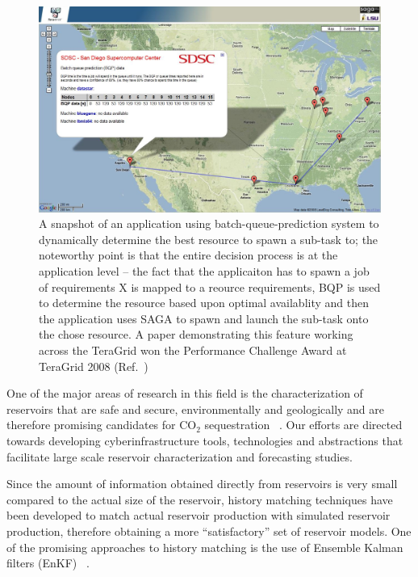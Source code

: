 \documentclass[a4paper,10pt]{article}
\begin{document}
\begin{figure}
\begin{center}
\includegraphics[scale=0.33]{gmaps_bqp.jpg}
\end{center}
\caption{A snapshot of an application using batch-queue-prediction system to dynamically determine the best resource to spawn a sub-task to; the noteworthy point is that the entire decision process is at the application level -- the fact that the applicaiton has to spawn a job of requirements X is mapped to a reource requirements, BQP is used to determine the resource based upon optimal availablity and then the application uses SAGA to spawn and launch the sub-task onto the chose resource. A paper demonstrating this feature working across the TeraGrid won the Performance Challenge Award at TeraGrid 2008 (Ref.~\cite{teragrid08})}
\label{}
\end{figure}

One of the major areas of research in this field is the characterization of reservoirs that are safe and secure, environmentally and geologically and are therefore promising candidates for CO$_2$ sequestration ~\cite{GeoRPT,Luigi}. Our efforts are directed towards developing cyberinfrastructure tools, technologies and abstractions that facilitate large scale reservoir characterization and forecasting studies.

Since the amount of information obtained directly from reservoirs is very small compared to the actual size of the reservoir, history matching techniques have been developed to match actual reservoir production with simulated reservoir production, therefore obtaining a more ``satisfactory'' set of reservoir models. One of the promising approaches to history matching is the use of Ensemble Kalman filters (EnKF) ~\cite{KalmanPaper, DO2007, LiEnKF07, DO2006}.
\end{document}
